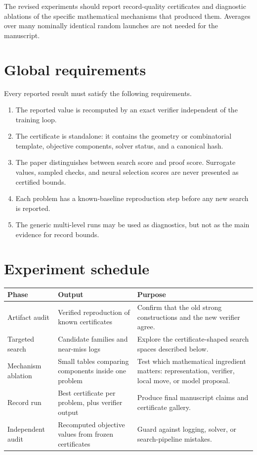 \documentclass[11pt]{article}
\begin{document}
The revised experiments should report record-quality certificates and
diagnostic ablations of the specific mathematical mechanisms that produced
them.  Averages over many nominally identical random launches are not needed
for the manuscript.

\section{Global requirements}

Every reported result must satisfy the following requirements.

\begin{enumerate}
\item The reported value is recomputed by an exact verifier independent of the
training loop.
\item The certificate is standalone: it contains the geometry or combinatorial
template, objective components, solver status, and a canonical hash.
\item The paper distinguishes between search score and proof score.  Surrogate
values, sampled checks, and neural selection scores are never presented as
certified bounds.
\item Each problem has a known-baseline reproduction step before any new
search is reported.
\item The generic multi-level runs may be used as diagnostics, but not as the
main evidence for record bounds.
\end{enumerate}

\section{Experiment schedule}

\begin{center}
\begin{tabularx}{\textwidth}{p{}p{}X}
\toprule
Phase & Output & Purpose \\
\midrule
Artifact audit & Verified reproduction of known certificates & Confirm that the old strong constructions and the new verifier agree. \\
Targeted search & Candidate families and near-miss logs & Explore the certificate-shaped search spaces described below. \\
Mechanism ablation & Small tables comparing components inside one problem & Test which mathematical ingredient matters: representation, verifier, local move, or model proposal. \\
Record run & Best certificate per problem, plus verifier output & Produce final manuscript claims and certificate gallery. \\
Independent audit & Recomputed objective values from frozen certificates & Guard against logging, solver, or search-pipeline mistakes. \\
\bottomrule
\end{tabularx}
\end{center}
\end{document}
